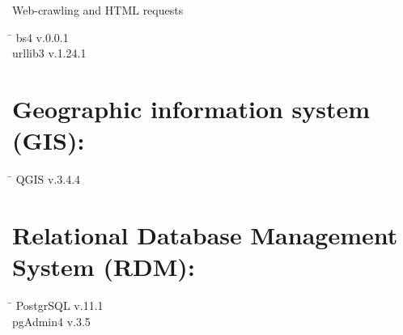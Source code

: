 \begin{large}Web-crawling and HTML requests\end{large}
 \begin{tabbing}
  \hspace*{5cm}  \= \kill
   bs4 \> v.0.0.1 \\
   urllib3 \> v.1.24.1 \\
 \end{tabbing}
 
 \section*{Geographic information system (GIS):}
  \begin{tabbing}
  \hspace*{5cm}  \= \kill
   QGIS \> v.3.4.4
 \end{tabbing}
 \section*{Relational Database Management System (RDM):}
  \begin{tabbing}
  \hspace*{5cm}  \= \kill
   PostgrSQL \> v.11.1 \\
   pgAdmin4 \> v.3.5
 \end{tabbing}

 
 
 
 
 
 
 
 
 
 
 
 
 
 
 
 

